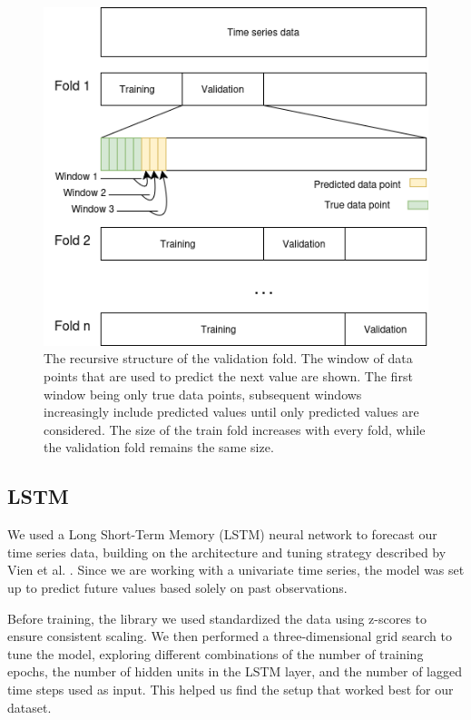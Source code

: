 \documentclass[conference]{IEEEtran}
\begin{document}
\begin{figure}
    \includegraphics[scale = 0.47]{pictures/recursivecv.drawio.png}
    \caption{The recursive structure of the validation fold. The window of data points that are used 
    to predict the next value are shown. The first window being only true data points, subsequent windows
    increasingly include predicted values until only predicted values are considered. The size of the 
    train fold increases with every fold, while the validation fold remains the same size.}
    \label{fig:recursivecv}
\end{figure}



\subsection{LSTM}
We used a Long Short-Term Memory (LSTM) neural network to forecast our time series data, building on 
the architecture and tuning strategy described by Vien et al. \cite{kuen2021machine}. Since we are working 
with a univariate time series, the model was set up to predict future values based solely on past 
observations.

Before training, the library we used standardized the data using z-scores to ensure consistent scaling. We 
then performed a three-dimensional grid search to tune the model, exploring different combinations of the 
number of training epochs, the number of hidden units in the LSTM layer, and the number of lagged time 
steps used as input. This helped us find the setup that worked best for our dataset.
\end{document}
